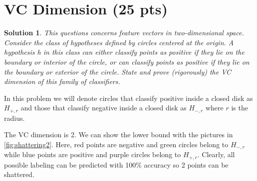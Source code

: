 \documentclass[12pt]{article}
\theoremstyle{definition}
\newtheorem*{solution*}{Solution}
\begin{document}
	\section{VC Dimension (25 pts)}
	\begin{solution*}
		\textit{This questions concerns feature vectors in two-dimensional space. Consider the class of hypotheses
			defined by circles centered at the origin. A hypothesis h in this class can either classify points as
			positive if they lie on the boundary or interior of the circle, or can classify points as positive if they
			lie on the boundary or exterior of the circle. State and prove (rigorously) the VC dimension of this family of classifiers.}
		
			In this problem we will denote circles that classify positive inside a  closed disk as $H_{+,r}$ and those that classify negative inside a closed disk as $H_{-,r}$ where $r$ is the radius. 
			
			The VC dimension is 2. We can show the lower bound with the pictures in \ref{fig:shattering2}. Here, red points are negative and green circles belong to $H_{-,r}$ while blue points are positive and purple circles belong to $H_{+,r}$. Clearly, all possible labeling can be predicted with 100\% accuracy so 2 points can be shattered.
		

\end{solution*}
\end{document}

